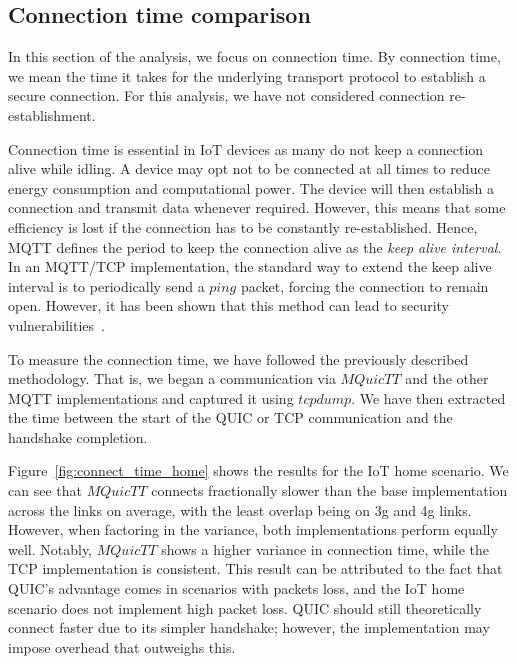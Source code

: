 \subsection{Connection time comparison} \label{sec:conn_time}

In this section of the analysis, we focus on connection time.
By connection time, we mean the time it takes for the underlying transport protocol to establish a secure connection.
For this analysis, we have not considered connection re-establishment.

Connection time is essential in IoT devices as many do not keep a connection alive while idling.
A device may opt not to be connected at all times to reduce energy consumption and computational power.
The device will then establish a connection and transmit data whenever required.
However, this means that some efficiency is lost if the connection has to be constantly re-established.
Hence, MQTT defines the period to keep the connection alive as the \textit{keep alive interval}.
In an MQTT/TCP implementation, the standard way to extend the keep alive interval is to periodically send a $ping$ packet, forcing the connection to remain open.
However, it has been shown that this method can lead to security vulnerabilities~\citep{vaccari_slowtt_2020,mileva_comprehensive_2021}.

To measure the connection time, we have followed the previously described methodology.
That is, we began a communication via $MQuicTT$ and the other MQTT implementations and captured it using $tcpdump$.
We have then extracted the time between the start of the QUIC or TCP communication and the handshake completion.

Figure~\ref{fig:connect_time_home} shows the results for the IoT home scenario.
We can see that $MQuicTT$ connects fractionally slower than the base implementation across the links on average, with the least overlap being on 3g and 4g links.
However, when factoring in the variance, both implementations perform equally well.
Notably, $MQuicTT$ shows a higher variance in connection time, while the TCP implementation is consistent.
This result can be attributed to the fact that QUIC's advantage comes in scenarios with packets loss, and the IoT home scenario does not implement high packet loss.
QUIC should still theoretically connect faster due to its simpler handshake; however, the implementation may impose overhead that outweighs this.

